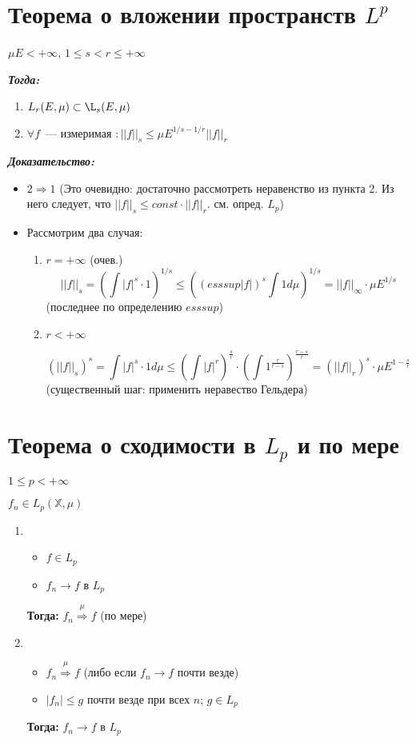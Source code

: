 \documentclass[paper=a4, fontsize=14pt]{report}
\begin{document}
\section{Теорема о вложении пространств $L^p$}

$ \mu E < +\infty$, $1 \leq s < r \leq + \infty$

\textbf{\emph{Тогда:}}

\begin{enumerate}
	\item $ L_r(E, \mu)  \subset \L_s(E, \mu)$
	\item $ \forall f$~--- измеримая $: ||f||_s \leq \mu E^{1/s - 1/r} ||f||_r$
\end{enumerate}


\textbf{\emph{Доказательство:}}

\begin{itemize}
	\item $2 \Rightarrow 1$ (Это очевидно: достаточно рассмотреть неравенство из пункта 2. Из него следует, что $ ||f||_s \leq const \cdot ||f||_r $. см. опред. $ L_p $)

	\item Рассмотрим два случая:
	\begin{enumerate}
		\item $ r = + \infty $ (очев.)
		$$ ||f||_s = (\int |f|^s \cdot 1)^{1/s} \leq ((esssup|f|)^s \int 1 d\mu)^{1/s} = ||f||_{\infty} \cdot \mu E^{1/s} $$ (последнее по определению $ esssup $)

		\item $ r < + \infty $

		$$ (||f||_s)^{s} = \int |f|^s \cdot 1 d\mu  \leq
		(\int |f|^r)^\frac{s}{r} \cdot (\int 1^\frac{r}{r - s})^\frac{r - s}{r} =
		(||f||_r)^s \cdot \mu E^{1 - \frac{s}{r}} $$ (существенный шаг: применить неравество Гельдера)
	\end{enumerate}
\end{itemize}

\section{Теорема о сходимости в $L_p$ и по мере}
$ 1 \leq p < +\infty $

$ f_n \in L_p(\mathbb{X}, \mu)$

\begin{enumerate}
	\item \begin{itemize}
		\item $ f \in L_p $
		\item $ f_n \rightarrow f $ в $ L_p $
	\end{itemize}
	\textbf{Тогда:} $ f_n \stackrel{\mu}{\Rightarrow} f $ (по мере)

	\item \begin{itemize}
		\item $ f_n \stackrel{\mu}{\Rightarrow} f $ (либо если $ f_n \rightarrow f $  почти везде)
		\item $ |f_n| \leq g $ почти везде при всех $n$; $g \in L_p$
	\end{itemize}
	\textbf{Тогда:} $ f_n \rightarrow f $ в $ L_p $
\end{enumerate}
\end{document}
